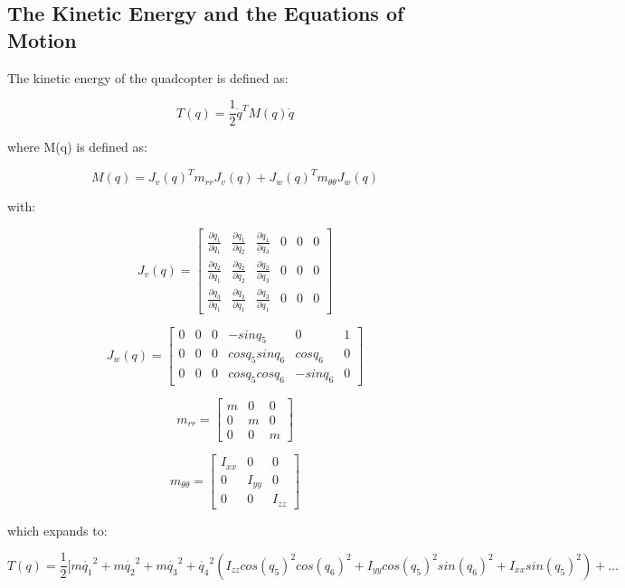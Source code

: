 \documentclass[10pt, letterpaper]{article}
\begin{document}


\subsection*{The Kinetic Energy and the Equations of Motion}

The kinetic energy of the quadcopter is defined as:

\[
T(q)=\frac{1}{2}\dot{q}^{T}M(q)\dot{q}
\]

where M(q) is defined as:

\[
M(q)=J_{v}(q)^{T}m_{rr}J_{v}(q)+J_{w}(q)^{T}m_{\theta\theta}J_{w}(q)
\]

with:

\[
J_{v}(q)=\left[\begin{array}{cccccc}
\frac{\partial q_{1}}{\partial q_{1}} & \frac{\partial q_{1}}{\partial q_{2}} & \frac{\partial q_{1}}{\partial q_{3}} & 0 & 0 & 0\\
\frac{\partial q_{2}}{\partial q_{1}} & \frac{\partial q_{2}}{\partial q_{2}} & \frac{\partial q_{2}}{\partial q_{3}} & 0 & 0 & 0\\
\frac{\partial q_{3}}{\partial q_{1}} & \frac{\partial q_{3}}{\partial q_{1}} & \frac{\partial q_{3}}{\partial q_{1}} & 0 & 0 & 0
\end{array}\right]
\]

\[
J_{w}(q)=\left[\begin{array}{cccccc}
0 & 0 & 0 & -sinq_{5} & 0 & 1\\
0 & 0 & 0 & cosq_{5}sinq_{6} & cosq_{6} & 0\\
0 & 0 & 0 & cosq_{5}cosq_{6} & -sinq_{6} & 0
\end{array}\right]
\]

\[
m_{rr}=\left[\begin{array}{ccc}
m & 0 & 0\\
0 & m & 0\\
0 & 0 & m
\end{array}\right]
\]

\[
m_{\theta\theta}=\left[\begin{array}{ccc}
I_{xx} & 0 & 0\\
0 & I_{yy} & 0\\
0 & 0 & I_{zz}
\end{array}\right]
\]

which expands to:

\[
T(q)=\frac{1}{2}[m\dot{q_{1}}^{2}+m\dot{q_{2}}^{2}+m\dot{q_{3}}^{2}+\dot{q_{4}}^{2}(I_{zz}cos(q_{5})^{2}cos(q_{6})^{2}+I_{yy}cos(q_{5})^{2}sin(q_{6})^{2}+I_{xx}sin(q_{5})^{2})+\ldots
\]
\end{document}
